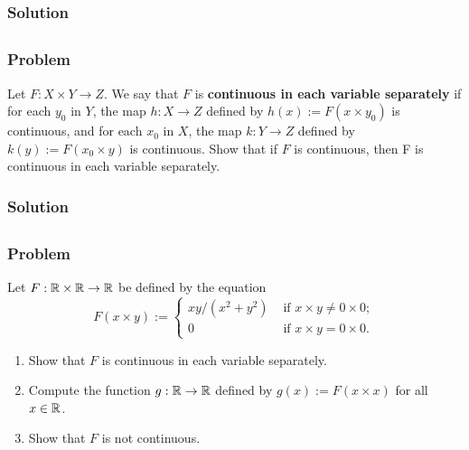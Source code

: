 \subsubsection{Solution}
\todo


\subsection{}

\subsubsection{Problem}
Let $F : X \times Y \to Z$. We say that $F$ is \textbf{continuous in each variable separately} if for each $y_0$ in $Y$, the map $h : X \to Z$ defined by $h(x) := F(x \times y_0)$ is continuous, and for each $x_0$ in $X$, the map $k : Y \to Z$ defined by $k(y) := F(x_0 \times y)$ is continuous. Show that if $F$ is continuous, then F is continuous in each variable separately.

\subsubsection{Solution}
\todo


\subsection{}

\subsubsection{Problem}
Let $F : \mathbb R \times \mathbb R \to \mathbb R$ be defined by the equation
\[ F(x \times y) := 
\left\{ \begin{array}{ll}
    xy/(x^2+y^2) & \mbox{ if } x \times y \neq 0 \times 0 ; \\
    0 & \mbox{ if } x \times y = 0 \times 0.
\end{array} \right. \]
\begin{enumerate}
    \item Show that $F$ is continuous in each variable separately.
    \item Compute the function $g : \mathbb R \to \mathbb R$ defined by $g(x) := F(x \times x)$ for all $x \in \mathbb R$.
    \item Show that $F$ is not continuous.
\end{enumerate}

